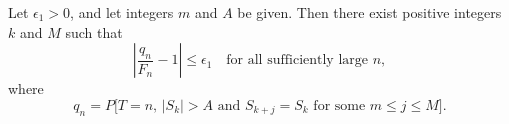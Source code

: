 Let $\epsilon_1 > 0$, and let integers $m$ and $A$ be given. Then there exist positive integers $k$ and $M$ such that
$$\left| \frac{q_n}{F_n} - 1 \right| \leq \epsilon_1 \quad \text{for all sufficiently large } n,$$
where
$$q_n = P\bigl[T = n, \, |S_k| > A \text{ and } S_{k+j} = S_k \text{ for some } m \leq j \leq M\bigr].$$
